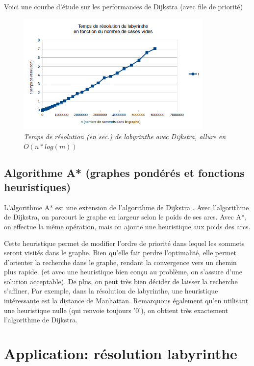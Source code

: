\documentclass[10pt]{article}
\begin{document}
				Voici une courbe d'étude sur les performances de Dijkstra (avec file de priorité)
				\begin{figure}[H]
					\begin{center}
						\includegraphics[height=6cm,keepaspectratio]{./images/courbe_temps.png}
					\end{center}
					\caption{\textit{Temps de résolution (en sec.) de labyrinthe avec Dijkstra, allure en \(O(n * log(m))\)}}
					\label{courbe_temps}
				\end{figure}

		\subsection{Algorithme A* (graphes pondérés et fonctions heuristiques)}
			L'algorithme A* est une extension de l'algorithme de Dijkstra \cite{computerphile_maze} \cite{computerphile_astar}.
			Avec l'algorithme de Dijkstra, on parcourt le graphe en largeur selon le poids de ses arcs.
			Avec A*, on effectue la même opération, mais on ajoute une heuristique \cite{heuristique} aux poids des arcs.\newline
			
			Cette heuristique permet de modifier l'ordre de priorité dans lequel les sommets seront visités dans le graphe.
			Bien qu'elle fait perdre l'optimalité, elle permet d'orienter la recherche dans le graphe, rendant la convergence vers
			un chemin plus rapide. (et avec une heuristique bien conçu au problème, on s'assure d'une solution acceptable).
			De plus, on peut très bien décider de laisser la recherche s'affiner, 
			Par exemple, dans la résolution de labyrinthe, une heuristique intéressante est la distance de Manhattan. \cite{manhattan}			
			Remarquons également qu'en utilisant une heuristique nulle (qui renvoie toujours '0'),
			on obtient très exactement l'algorithme de Dijkstra.

	\section{Application: résolution labyrinthe}
	
\end{document}
